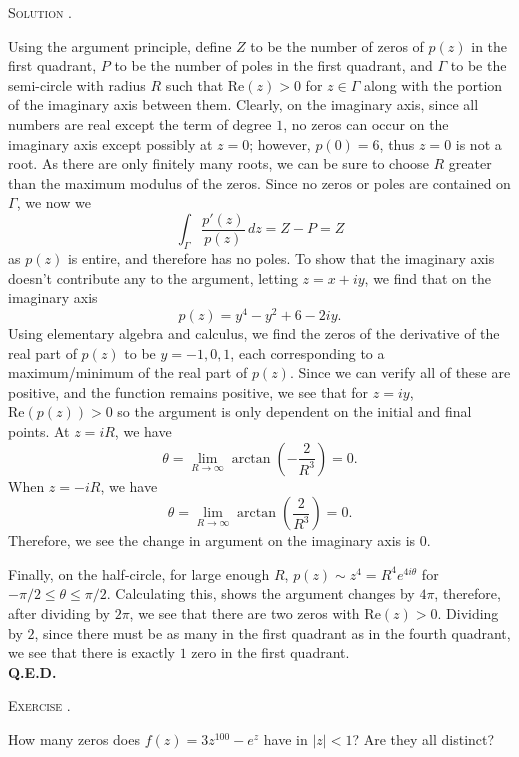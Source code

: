 \documentclass[12pt]{article}
\newcounter{problem}
\renewcommand{\qed}{\hfill\textsc{\textbf{Q.E.D.}}}
\renewcommand{\Re}{\ensuremath{\mathrm{Re}}}
\newenvironment{problem}[1][\stepcounter{problem}\theproblem]{\bigskip\noindent\textsc{Exercise #1.}\smallskip\par\begin{itshape}}{\end{itshape}}
\newenvironment{solution}[1][\hspace{-1ex}.]{\medskip\noindent\textsc{Solution #1}\smallskip\par}{\hspace*{\fill}\\ \hspace*{0pt}\qed \clearpage}
\begin{document}
\begin{solution}
    Using the argument principle, define $Z$ to be the number of zeros of $p(z)$ in the first quadrant, $P$ to be the number of poles in the first quadrant, and $\Gamma$ to be the semi-circle with radius $R$ such that $\Re(z)>0$ for $z\in \Gamma$ along with the portion of the imaginary axis between them. Clearly, on the imaginary axis, since all numbers are real except the term of degree $1$, no zeros can occur on the imaginary axis except possibly at $z=0$; however, $p(0)=6$, thus $z=0$ is not a root. As there are only finitely many roots, we can be sure to choose $R$ greater than the maximum modulus of the zeros. Since no zeros or poles are contained on $\Gamma$, we now we
    \[
        \int_\Gamma\frac{p'(z)}{p(z)}\,dz=Z-P=Z
    \]
    as $p(z)$ is entire, and therefore has no poles. To show that the imaginary axis doesn't contribute any to the argument, letting $z=x+iy$, we find that on the imaginary axis
    \[
        p(z)=y^4-y^2+6-2iy.
    \]
    Using elementary algebra and calculus, we find the zeros of the derivative of the real part of $p(z)$ to be $y=-1,0,1$, each corresponding to a maximum/minimum of the real part of $p(z)$. Since we can verify all of these are positive, and the function remains positive, we see that for $z=iy$, $\Re(p(z))>0$ so the argument is only dependent on the initial and final points. At $z=iR$, we have 
    \[
        \theta=\lim_{R\to\infty}\arctan\left(-\frac{2}{R^3}\right)=0. 
    \]
    When $z=-iR$, we have
    \[
        \theta=\lim_{R\to\infty}\arctan\left(\frac{2}{R^3}\right)=0.
    \]
    Therefore, we see the change in argument on the imaginary axis is $0$.
    
    Finally, on the half-circle, for large enough $R$, $p(z)\sim z^4=R^4e^{4i\theta}$ for $-\pi/2\leq\theta\leq\pi/2$. Calculating this, shows the argument changes by $4\pi$, therefore, after dividing by $2\pi$, we see that there are two zeros with $\Re(z)>0$. Dividing by $2$, since there must be as many in the first quadrant as in the fourth quadrant, we see that there is exactly $1$ zero in the first quadrant.
\end{solution}

\begin{problem}
    How many zeros does $f(z)=3z^{100}-e^z$ have in $|z|<1$? Are they all distinct?
\end{problem}
\end{document}
